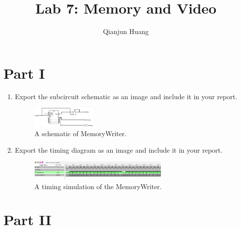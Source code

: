 \documentclass{article}
\title{Lab 7: Memory and Video}
\author{Qianjun Huang}
\begin{document}
\maketitle

\section{Part I}

\begin{enumerate}
\item Export the subcircuit schematic as an image and include it in your report.

\begin{figure}[ht!]
    \centering
    \includegraphics[width=0.3\textwidth]{memory_writer.png}
    \caption{A schematic of MemoryWriter.}
    \label{f:part1_memory_writer}
\end{figure}

\item Export the timing diagram as an image and include it in your report.

\begin{figure}[ht!]
    \centering
    \includegraphics[width=0.65\textwidth]{lab7_part1_timing.png}
    \caption{A timing simulation of the MemoryWriter.}
    \label{f:part1_timing}
\end{figure}
\end{enumerate}

\section{Part II}

\end{document}
